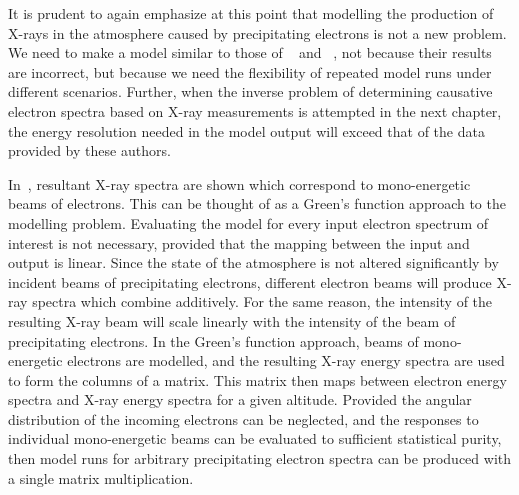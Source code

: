 It is prudent to again emphasize at this point that modelling the production of X-rays in the atmosphere caused by precipitating electrons is not a new problem. We need to make a model similar to those of ~\cite{Rees1963} and ~\cite{Berger1972}, not because their results are incorrect, but because we need the flexibility of repeated model runs under different scenarios. Further, when the inverse problem of determining causative electron spectra based on X-ray measurements is attempted in the next chapter, the energy resolution needed in the model output will exceed that of the data provided by these authors.

In~\cite{Berger1972}, resultant X-ray spectra are shown which correspond to mono-energetic beams of electrons. This can be thought of as a Green's function approach to the modelling problem. Evaluating the model for every input electron spectrum of interest is not necessary, provided that the mapping between the input and output is linear. Since the state of the atmosphere is not altered significantly by incident beams of precipitating electrons, different electron beams will produce X-ray spectra which combine additively. For the same reason, the intensity of the resulting X-ray beam will scale linearly with the intensity of the beam of precipitating electrons. In the Green's function approach, beams of mono-energetic electrons are modelled, and the resulting X-ray energy spectra are used to form the columns of a matrix. This matrix then maps between electron energy spectra and X-ray energy spectra for a given altitude. Provided the angular distribution of the incoming electrons can be neglected, and the responses to individual mono-energetic beams can be evaluated to sufficient statistical purity, then model runs for arbitrary precipitating electron spectra can be produced with a single matrix multiplication. 

